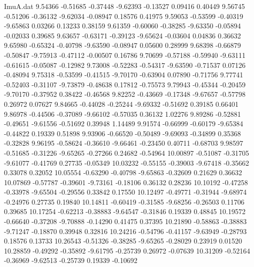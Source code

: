 \begin{filecontents}{ImuA.dat}
   9.54366   -0.51685   -0.37448   -9.62393   -0.13527    0.09416    0.40449
   9.56745   -0.51206   -0.36132   -9.62034   -0.08947    0.18576    0.41975
   9.59053   -0.53599   -0.40319   -9.65863    0.03266    0.13233    0.38159
   9.61359   -0.60060   -0.38285   -9.63350   -0.05894   -0.02033    0.39685
   9.63657   -0.63171   -0.39123   -9.65624   -0.03604    0.04836    0.36632
   9.65980   -0.65324   -0.40798   -9.63590   -0.08947    0.05600    0.28999
   9.68398   -0.66879   -0.50847   -9.75913   -0.47112   -0.00507    0.16786
   9.70699   -0.57188   -0.59940   -9.63111   -0.61615   -0.05087   -0.12982
   9.73008   -0.52283   -0.54317   -9.63590   -0.71537    0.07126   -0.48094
   9.75318   -0.53599   -0.41515   -9.70170   -0.63904    0.07890   -0.71756
   9.77741   -0.52403   -0.31107   -9.73879   -0.48638    0.17812   -0.75573
   9.79943   -0.45344   -0.20459   -9.70170   -0.37952    0.38422   -0.46568
   9.82252   -0.43669   -0.17348   -9.67657   -0.57798    0.26972    0.07627
   9.84665   -0.44028   -0.25244   -9.69332   -0.51692    0.39185    0.66401
   9.86978   -0.44506   -0.37089   -9.66102   -0.57035    0.36132    1.02276
   9.89286   -0.52881   -0.49651   -9.61556   -0.51692    0.39948    1.14489
   9.91574   -0.66999   -0.60179   -9.65384   -0.44822    0.19339    0.51898
   9.93906   -0.66520   -0.50489   -9.69093   -0.34899    0.35368   -0.32828
   9.96195   -0.58624   -0.36610   -9.66461   -0.23450    0.40711   -0.68703
   9.98597   -0.51685   -0.31226   -9.65265   -0.27266    0.24682   -0.54964
  10.00897   -0.51087   -0.31705   -9.61077   -0.41769    0.27735   -0.05349
  10.03232   -0.55155   -0.39003   -9.67418   -0.35662    0.33078    0.32052
  10.05554   -0.63290   -0.40798   -9.65863   -0.32609    0.21629    0.36632
  10.07869   -0.57787   -0.39601   -9.73161   -0.18106    0.36132    0.28236
  10.10192   -0.47258   -0.33978   -9.65504   -0.29556    0.33842    0.17550
  10.12497   -0.49771   -0.31944   -9.68974   -0.24976    0.27735    0.19840
  10.14811   -0.60419   -0.31585   -9.68256   -0.26503    0.11706    0.39685
  10.17254   -0.62213   -0.38883   -9.64547   -0.31846    0.19339    0.48845
  10.19572   -0.66640   -0.37208   -9.70888   -0.14290    0.41475    0.37395
  10.21890   -0.58863   -0.38883   -9.71247   -0.18870    0.39948    0.32816
  10.24216   -0.54796   -0.41157   -9.63949   -0.28793    0.18576    0.13733
  10.26543   -0.51326   -0.38285   -9.65265   -0.28029    0.23919    0.01520
  10.28859   -0.49292   -0.35892   -9.61795   -0.25739    0.26972   -0.07639
  10.31209   -0.52164   -0.36969   -9.62513   -0.25739    0.19339   -0.10692

\end{filecontents}
